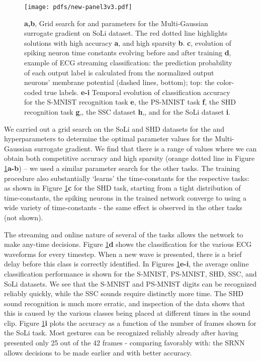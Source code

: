 \documentclass[fleqn,10pt]{wlscirep}
\begin{document}
\begin{figure}[ht!]
\centering
\texttt{[image: pdfs/new-panel3v3.pdf]}
\caption{\textbf{a,b}, Grid search for  and  parameters for the Multi-Gaussian surrogate gradient on SoLi dataset. The red dotted line highlights solutions with high accuracy \textbf{a}, and high sparsity \textbf{b}. \textbf{c}, evolution of spiking neuron time constants evolving before and after training \textbf{d}, example of ECG streaming classification: the prediction probability of each output label is calculated from the normalized output neurons' membrane potential (dashed lines, bottom); top: the color-coded true labels. \textbf{e-i} Temporal evolution of classification accuracy for the S-MNIST recognition task \textbf{e}, the PS-MNIST task \textbf{f}, the SHD recognition task \textbf{g},, the SSC dataset \textbf{h},, and for the SoLi dataset \textbf{i}. }

\label{fig:panel3}
\end{figure}


We carried out a grid search on the SoLi and SHD datasets for the  and  hyperparameters to determine the optimal parameter values for the Multi-Gaussian surrogate gradient. We find that there is a range of values where we can obtain both competitive accuracy and high sparsity (orange dotted line in Figure \ref{fig:panel3}\textbf{a-b}) -- we used a similar parameter search for the other tasks. The training procedure also substantially `learns' the time-constants for the respective tasks: as shown in Figure \ref{fig:panel3}\textbf{c} for the SHD task, starting from a tight distribution of time-constants, the spiking neurons in the trained network converge to using a wide variety of time-constants - the same effect is observed in the other tasks (not shown). 

The streaming and online nature of several of the tasks allows the network to make any-time decisions. Figure \ref{fig:panel3}\textbf{d} shows the classification for the various ECG waveforms for every timestep. When a new wave is presented, there is a brief delay before this class is correctly identified. In Figures \ref{fig:panel3}\textbf{e-i}, the average online classification performance is shown for the  S-MNIST, PS-MNIST, SHD, SSC, and SoLi datasets. We see that the S-MNIST and PS-MNIST digits can be recognized reliably quickly, while the SSC sounds require distinctly more time. The SHD sound recognition is much more erratic, and inspection of the data shows that this is caused by the various classes being placed at different times in the sound clip. Figure \ref{fig:panel3}\textbf{i} plots the accuracy as a function of the number of frames shown for the SoLi task. Most gestures can be recognized reliably already after having presented only 25 out of the 42 frames - comparing favorably with\cite{wang2016interacting}: the SRNN allows decisions to be made earlier and with better accuracy. 
\end{document}

